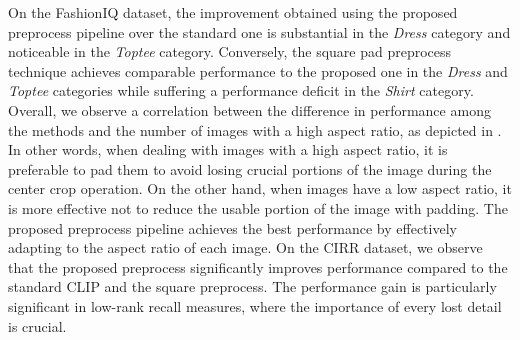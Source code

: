\documentclass[acmlarge]{acmart}
\begin{document}
On the FashionIQ dataset, the improvement obtained using the proposed preprocess pipeline over the standard one is substantial in the \emph{Dress} category and noticeable in the \emph{Toptee} category.
Conversely, the square pad preprocess technique achieves comparable performance to the proposed one in the \emph{Dress} and \emph{Toptee} categories while suffering a performance deficit in the \emph{Shirt} category.
Overall, we observe a correlation between the difference in performance among the methods and the number of images with a high aspect ratio, as depicted in . 
In other words, when dealing with images with a high aspect ratio, it is preferable to pad them to avoid losing crucial portions of the image during the center crop operation. On the other hand, when images have a low aspect ratio, it is more effective not to reduce the usable portion of the image with padding. The proposed preprocess pipeline achieves the best performance by effectively adapting to the aspect ratio of each image.
On the CIRR dataset, we observe that the proposed preprocess significantly improves performance compared to the standard CLIP and the square preprocess. The performance gain is particularly significant in low-rank recall measures, where the importance of every lost detail is crucial.
\end{document}
